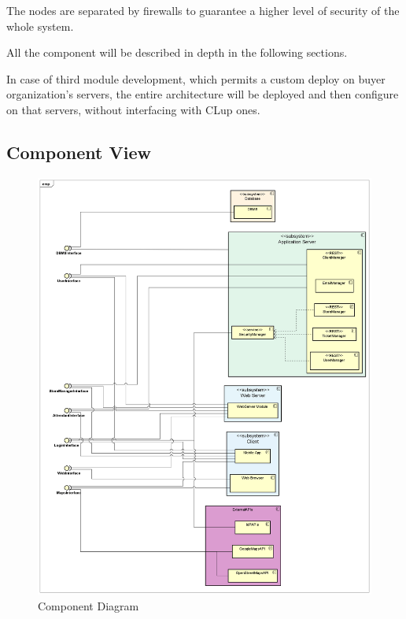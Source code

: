 \documentclass[table, 12pt]{article}
\begin{document}
The nodes are separated by firewalls to guarantee a higher level of security of the whole system.

All the component will be described in depth in the following sections.

In case of third module development, which permits a custom deploy on buyer organization's servers, the entire architecture will be deployed and then configure on that servers, without interfacing with CLup ones.

\subsection{Component View}

\begin{figure}[H]
    \begin{center}
        \includegraphics[width=\textwidth]{assets/Architectural-Design/ComponentDiagram.png}
        \caption{Component Diagram}\label{component_diagram}
    \end{center}
\end{figure}
\end{document}
